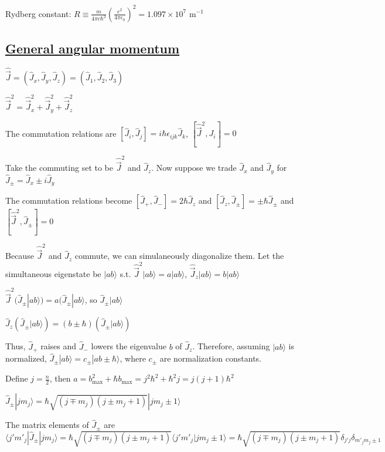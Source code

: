 Rydberg constant: $R \equiv \frac{m}{4 \pi c \hbar^3} (\frac{e^2}{4 \pi \epsilon_0})^2 = 1.097 \times 10^7 \textrm{ m}^{-1}$

\subsection{\underline{General angular momentum}}
$\widehat{\vec{J}} = (\widehat{J}_x, \widehat{J}_y, \widehat{J}_z) = (\widehat{J}_1, \widehat{J}_2, \widehat{J}_3)$

$\widehat{\vec{J}}^2 = \widehat{\vec{J}}^2_x + \widehat{\vec{J}}^2_y + \widehat{\vec{J}}^2_z$

The commutation relations are $[\widehat{J}_i, \widehat{J}_j] = i \hbar \epsilon_{ijk} \widehat{J}_k$, $[\widehat{\vec{J}}^2, J_i] = 0$

Take the commuting set to be $\widehat{\vec{J}}^2$ and $\widehat{J}_z$. Now suppose we trade $\widehat{J}_x$ and $\widehat{J}_y$ for $\widehat{J}_{\pm} = \widehat{J}_x \pm i \widehat{J}_y$

The commutation relations become $[\widehat{J}_{+}, \widehat{J}_{-}] = 2 \hbar \widehat{J}_z$ and $[\widehat{J}_z, \widehat{J}_{\pm}] = \pm \hbar \widehat{J}_{\pm}$ and $[\widehat{\vec{J}}^2, \widehat{J}_{\pm}] = 0$

Because $\widehat{\vec{J}}^2$ and $\widehat{J}_z$ commute, we can simulaneously diagonalize them. Let the simultaneous eigenstate be $|ab\rangle$ s.t. $\widehat{\vec{J}}^2 | ab \rangle  = a | ab \rangle$, $\widehat{\vec{J}}_z | ab \rangle = b | ab \rangle$

$\widehat{\vec{J}}^2 ( \widehat{J}_{\pm} | ab \rangle) = a(\widehat{J}_{\pm} | ab \rangle$, so $\widehat{J}_{\pm} | ab \rangle$

$\widehat{J}_z(\widehat{J}_\pm |ab\rangle) = (b \pm \hbar) (\widehat{J}_{\pm} | ab \rangle)$

Thus, $\widehat{J}_{+}$ raises and $\widehat{J}_{-}$ lowers the eigenvalue $b$ of $\widehat{J}_z$. Therefore, assuming $|ab \rangle$ is normalized, $\widehat{J}_{\pm} | ab \rangle = c_{\pm} | ab \pm \hbar \rangle$, where $c_{\pm}$ are normalization constants.

Define $j = \frac{n}{2}$, then $a = b_{\textrm{max}}^2 + \hbar b_{\textrm{max}} = j^2 \hbar^2 + \hbar^2 j = j(j+1) \hbar^2$

$\widehat{J}_{\pm} | j m_j \rangle = \hbar \sqrt{(j \mp m_j)(j \pm m_j + 1)} | j m_j \pm 1 \rangle$

The matrix elements of $\widehat{J}_{\pm}$ are $\langle j' m'_j | \widehat{J}_{\pm} | j m_j \rangle = \hbar \sqrt{(j \mp m_j) (j \pm m_j + 1)} \langle j' m'_j | j m_j \pm 1 \rangle = \hbar \sqrt{(j \mp m_j)(j \pm m_j + 1)} \delta_{j' j} \delta_{m'_j m_j \pm 1}$

